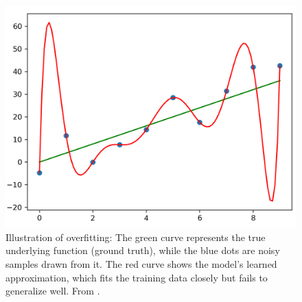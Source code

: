 \begin{figure}[H]
    \centering
    \includegraphics[width=0.5\linewidth]{images/Pyplot_overfitting.png}
  \caption{Illustration of overfitting: The green curve represents the true underlying function (ground truth), while the blue 
    dots are noisy samples drawn from it. The red curve shows the model's learned approximation, which fits the training data 
    closely but fails to generalize well. From \cite{wiki:xxx}.}
    \label{model_exploit}
\end{figure}

